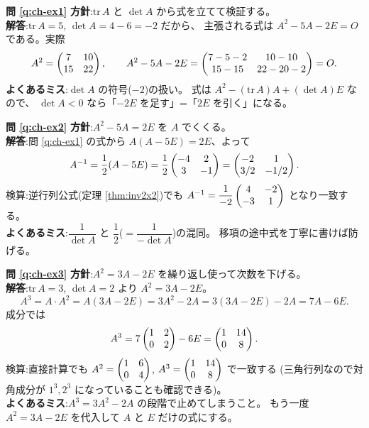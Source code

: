 \bigskip
\noindent\textbf{問 \ref{q:ch-ex1}}\quad
\textbf{方針}:$\mathrm{tr}\,A$ と $\det A$ から式を立てて検証する。\\
\textbf{解答}:$\mathrm{tr}\,A = 5$, $\det A = 4 - 6 = -2$ だから、
主張される式は $A^2 - 5A - 2E = O$ である。実際
\[
A^2 = \begin{pmatrix}7 & 10 \\ 15 & 22\end{pmatrix}, \qquad
A^2 - 5A - 2E
= \begin{pmatrix}7 - 5 - 2 & 10 - 10 \\ 15 - 15 & 22 - 20 - 2\end{pmatrix} = O.
\]
\textbf{よくあるミス}:$\det A$ の符号($-2$)の扱い。
式は $A^2 - (\mathrm{tr}\,A)A + (\det A)E$ なので、
$\det A < 0$ なら「$-2E$ を足す」=「$2E$ を引く」になる。

\bigskip
\noindent\textbf{問 \ref{q:ch-ex2}}\quad
\textbf{方針}:$A^2 - 5A = 2E$ を $A$ でくくる。\\
\textbf{解答}:問 \ref{q:ch-ex1} の式から $A(A - 5E) = 2E$、よって
\[
A^{-1} = \frac{1}{2}(A - 5E)
= \frac{1}{2}\begin{pmatrix}-4 & 2 \\ 3 & -1\end{pmatrix}
= \begin{pmatrix}-2 & 1 \\ 3/2 & -1/2\end{pmatrix}.
\]
検算:逆行列公式(定理 \ref{thm:inv2x2})でも
$A^{-1} = \dfrac{1}{-2}\begin{pmatrix}4 & -2 \\ -3 & 1\end{pmatrix}$ となり一致する。\\
\textbf{よくあるミス}:$\dfrac{1}{\det A}$ と
$\dfrac{1}{2}$($= \dfrac{1}{-\det A}$)の混同。
移項の途中式を丁寧に書けば防げる。

\bigskip
\noindent\textbf{問 \ref{q:ch-ex3}}\quad
\textbf{方針}:$A^2 = 3A - 2E$ を繰り返し使って次数を下げる。\\
\textbf{解答}:$\mathrm{tr}\,A = 3$, $\det A = 2$ より $A^2 = 3A - 2E$。
\[
A^3 = A \cdot A^2 = A(3A - 2E) = 3A^2 - 2A = 3(3A - 2E) - 2A = 7A - 6E.
\]
成分では
\[
A^3 = 7\begin{pmatrix}1 & 2 \\ 0 & 2\end{pmatrix} - 6E = \begin{pmatrix}1 & 14 \\ 0 & 8\end{pmatrix}.
\]
検算:直接計算でも $A^2 = \begin{pmatrix}1 & 6 \\ 0 & 4\end{pmatrix}$,
$A^3 = \begin{pmatrix}1 & 14 \\ 0 & 8\end{pmatrix}$ で一致する
(三角行列なので対角成分が $1^3, 2^3$ になっていることも確認できる)。\\
\textbf{よくあるミス}:$A^3 = 3A^2 - 2A$ の段階で止めてしまうこと。
もう一度 $A^2 = 3A - 2E$ を代入して $A$ と $E$ だけの式にする。

